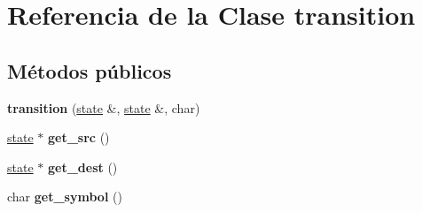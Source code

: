 \hypertarget{classtransition}{}\section{Referencia de la Clase transition}
\label{classtransition}
\subsection*{Métodos públicos}
\begin{DoxyCompactItemize}
\item 
\hypertarget{classtransition_a491a32572a6d2123b33d5da3fb8cf1de}{}{\bfseries transition} (\hyperlink{classstate}{state} \&, \hyperlink{classstate}{state} \&, char)\label{classtransition_a491a32572a6d2123b33d5da3fb8cf1de}

\item 
\hypertarget{classtransition_a8f29c04ae2dc9c413302d52162ef3712}{}\hyperlink{classstate}{state} $\ast$ {\bfseries get\+\_\+src} ()\label{classtransition_a8f29c04ae2dc9c413302d52162ef3712}

\item 
\hypertarget{classtransition_ad81b0682ac16f21d4674ce10e2add21c}{}\hyperlink{classstate}{state} $\ast$ {\bfseries get\+\_\+dest} ()\label{classtransition_ad81b0682ac16f21d4674ce10e2add21c}

\item 
\hypertarget{classtransition_a103474e5563d6d39cb8ce3013b065440}{}char {\bfseries get\+\_\+symbol} ()\label{classtransition_a103474e5563d6d39cb8ce3013b065440}

\end{DoxyCompactItemize}
